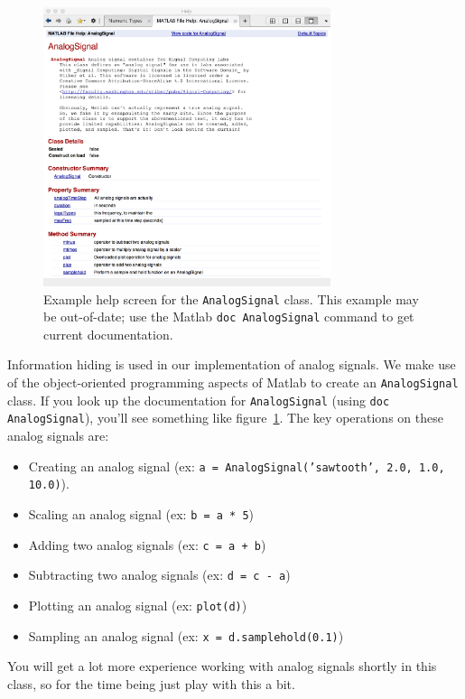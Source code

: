 \begin{figure}
\begin{center}
\includegraphics[width=0.75\textwidth]{lab1/AnalogSignal-help}
\end{center}
\caption{Example help screen for the \texttt{AnalogSignal}
  class. This example may be out-of-date; use the Matlab
  \texttt{doc AnalogSignal} command to get current
  documentation.\label{fg:analogsignal-help}}
\end{figure}

Information hiding is used in our implementation of analog signals. We
make use of the object-oriented programming aspects of Matlab to
create an \texttt{AnalogSignal} class. If you look up the
documentation for \texttt{AnalogSignal} (using
\verb|doc AnalogSignal|), you'll see something like
figure~\ref{fg:analogsignal-help}. The key operations on these analog
signals are:
\begin{itemize}
\item Creating an analog signal (ex: \texttt{a =
    AnalogSignal('sawtooth', 2.0, 1.0, 10.0)}).
\item Scaling an analog signal (ex: \texttt{b = a * 5})
\item Adding two analog signals (ex: \texttt{c = a + b})
\item Subtracting two analog signals (ex: \texttt{d = c - a})
\item Plotting an analog signal (ex: \texttt{plot(d)})
\item Sampling an analog signal (ex: \texttt{x = d.samplehold(0.1)})
\end{itemize}

You will get a lot more experience working with analog signals shortly
in this class, so for the time being just play with this a bit.

